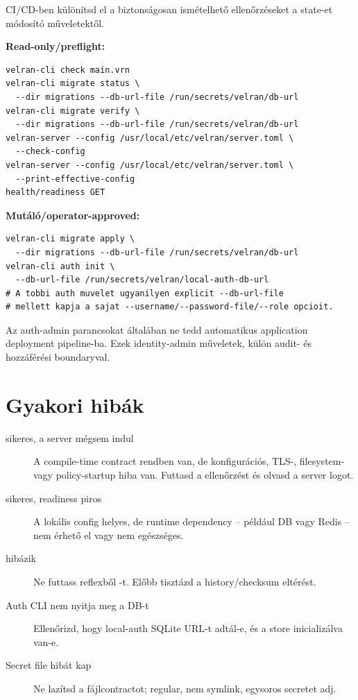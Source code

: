 CI/CD-ben különítsd el a biztonságosan ismételhető ellenőrzéseket a state-et módosító műveletektől.

\textbf{Read-only/preflight:}

\begin{lstlisting}
velran-cli check main.vrn
velran-cli migrate status \
  --dir migrations --db-url-file /run/secrets/velran/db-url
velran-cli migrate verify \
  --dir migrations --db-url-file /run/secrets/velran/db-url
velran-server --config /usr/local/etc/velran/server.toml \
  --check-config
velran-server --config /usr/local/etc/velran/server.toml \
  --print-effective-config
health/readiness GET
\end{lstlisting}

\textbf{Mutáló/operator-approved:}

\begin{lstlisting}
velran-cli migrate apply \
  --dir migrations --db-url-file /run/secrets/velran/db-url
velran-cli auth init \
  --db-url-file /run/secrets/velran/local-auth-db-url
# A tobbi auth muvelet ugyanilyen explicit --db-url-file
# mellett kapja a sajat --username/--password-file/--role opcioit.
\end{lstlisting}

Az auth-admin parancsokat általában ne tedd automatikus application deployment pipeline-ba. Ezek identity-admin műveletek, külön audit- és hozzáférési boundaryval.

\section{Gyakori hibák}

\begin{description}
  \item[ sikeres, a server mégsem indul] A compile-time contract rendben van, de konfigurációs, TLS-, filesystem- vagy policy-startup hiba van. Futtasd a  ellenőrzést és olvasd a server logot.
  \item[\code{--check-config} sikeres, readiness piros] A lokális config helyes, de runtime dependency -- például DB vagy Redis -- nem érhető el vagy nem egészséges.
  \item[ hibázik] Ne futtass reflexből -t. Előbb tisztázd a history/checksum eltérést.
  \item[Auth CLI nem nyitja meg a DB-t] Ellenőrizd, hogy local-auth SQLite URL-t adtál-e, és a store inicializálva van-e.
  \item[Secret file hibát kap] Ne lazítsd a fájlcontractot; regular, nem symlink, egysoros secretet adj.
\end{description}

